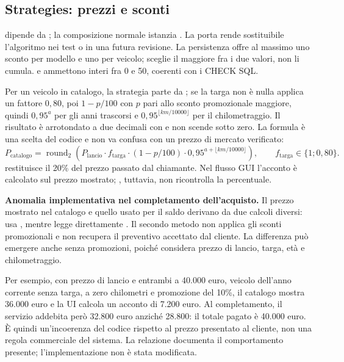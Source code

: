 \subsection{Strategies: prezzi e sconti}\label{sec:pricing}
 dipende da ; la composizione normale istanzia . La porta rende sostituibile l'algoritmo nei test o in una futura revisione. La persistenza offre al massimo uno sconto per modello e uno per veicolo;  sceglie il maggiore fra i due valori, non li cumula.  e  ammettono interi fra 0 e 50, coerenti con i CHECK SQL.

Per un veicolo in catalogo, la strategia parte da ; se la targa non è nulla applica un fattore $0{,}80$, poi $1-p/100$ con $p$ pari allo sconto promozionale maggiore, quindi $0{,}95^{a}$ per gli anni trascorsi e $0{,}95^{\lfloor km/10000\rfloor}$ per il chilometraggio. Il risultato è arrotondato a due decimali con  e non scende sotto zero. La formula è una scelta del codice e non va confusa con un prezzo di mercato verificato:
\[
P_{\mathrm{catalogo}}=
\operatorname{round}_{2}\!\left(
P_{\mathrm{lancio}}\cdot f_{\mathrm{targa}}
\cdot (1-p/100)\cdot 0{,}95^{a+\lfloor km/10000\rfloor}
\right),\qquad
f_{\mathrm{targa}}\in\{1;0{,}80\}.
\]
 restituisce il 20\% del prezzo passato dal chiamante. Nel flusso GUI l'acconto è calcolato sul prezzo mostrato; , tuttavia, non ricontrolla la percentuale.

\textbf{Anomalia implementativa nel completamento dell'acquisto.} Il prezzo mostrato nel catalogo e quello usato per il saldo derivano da due calcoli diversi:  usa , mentre  legge direttamente . Il secondo metodo non applica gli sconti promozionali e non recupera il preventivo accettato dal cliente. La differenza può emergere anche senza promozioni, poiché  considera prezzo di lancio, targa, età e chilometraggio.

Per esempio, con prezzo di lancio e  entrambi a 40.000 euro, veicolo dell'anno corrente senza targa, a zero chilometri e promozione del 10\%, il catalogo mostra 36.000 euro e la UI calcola un acconto di 7.200 euro. Al completamento, il servizio addebita però 32.800 euro anziché 28.800: il totale pagato è 40.000 euro. È quindi un'incoerenza del codice rispetto al prezzo presentato al cliente, non una regola commerciale del sistema. La relazione documenta il comportamento presente; l'implementazione non è stata modificata.


